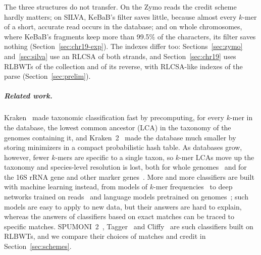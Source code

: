 The three structures do not transfer.
On the Zymo reads the credit scheme hardly matters; on SILVA, KeBaB's filter saves little, because almost every $k$-mer of a short, accurate read occurs in the database; and on whole chromosomes, where KeBaB's fragments keep more than 99.5\% of the characters, its filter saves nothing (Section~\ref{sec:chr19-exp}).
The indexes differ too: Sections~\ref{sec:zymo} and~\ref{sec:silva} use an RLCSA of both strands, and Section~\ref{sec:chr19} uses RLBWTs of the collection and of its reverse, with RLCSA-like indexes of the parse (Section~\ref{sec:prelim}).

\subparagraph*{Related work.}
Kraken~\cite{WS14} made taxonomic classification fast by precomputing, for every $k$-mer in the database, the lowest common ancestor (LCA) in the taxonomy of the genomes containing it, and Kraken~2~\cite{WLL19} made the database much smaller by storing minimizers in a compact probabilistic hash table.
As databases grow, however, fewer $k$-mers are specific to a single taxon, so $k$-mer LCAs move up the taxonomy and species-level resolution is lost, both for whole genomes~\cite{NKPT18} and for the 16S rRNA gene and other marker genes~\cite{CLMP24}.
More and more classifiers are built with machine learning instead, from models of $k$-mer frequencies~\cite{RSE+20,MAHK22,LKYH23,AHL+24} to deep networks trained on reads~\cite{LBL+20,MKK+22} and language models pretrained on genomes~\cite{JZLD21,DLT+25}; such models are easy to apply to new data, but their answers are hard to explain, whereas the answers of classifiers based on exact matches can be traced to specific matches.
SPUMONI~2~\cite{AhmedEtAl2023}, Tagger~\cite{DAF+25} and Cliffy~\cite{ABL25} are such classifiers built on RLBWTs, and we compare their choices of matches and credit in Section~\ref{sec:schemes}.

